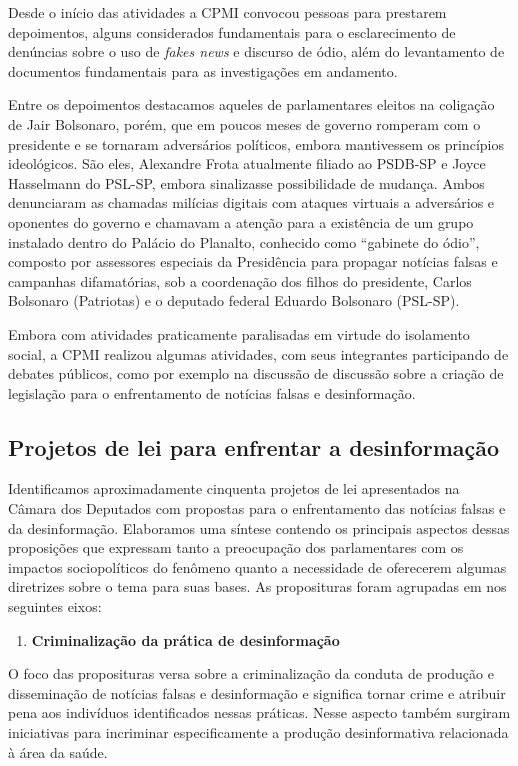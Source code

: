Desde o início das atividades a CPMI convocou pessoas para prestarem
depoimentos, alguns considerados fundamentais para o esclarecimento de
denúncias sobre o uso de \emph{fakes news} e discurso de ódio, além do
levantamento de documentos fundamentais para as investigações em
andamento.

Entre os depoimentos destacamos aqueles de parlamentares eleitos na
coligação de Jair Bolsonaro, porém, que em poucos meses de governo
romperam com o presidente e se tornaram adversários políticos, embora
mantivessem os princípios ideológicos. São eles, Alexandre Frota
atualmente filiado ao PSDB-SP e Joyce Hasselmann do PSL-SP, embora
sinalizasse possibilidade de mudança. Ambos denunciaram as chamadas
milícias digitais com ataques virtuais a adversários e oponentes do
governo e chamavam a atenção para a existência de um grupo instalado
dentro do Palácio do Planalto, conhecido como ``gabinete do ódio'',
composto por assessores especiais da Presidência para propagar notícias
falsas e campanhas difamatórias, sob a coordenação dos filhos do
presidente, Carlos Bolsonaro (Patriotas) e o deputado federal Eduardo
Bolsonaro (PSL-SP).

Embora com atividades praticamente paralisadas em virtude do isolamento
social, a CPMI realizou algumas atividades, com seus integrantes
participando de debates públicos, como por exemplo na discussão de
discussão sobre a criação de legislação para o enfrentamento de notícias
falsas e desinformação.

\subsection{Projetos de lei para enfrentar a desinformação}

Identificamos aproximadamente cinquenta projetos de lei apresentados na
Câmara dos Deputados com propostas para o enfrentamento das notícias
falsas e da desinformação. Elaboramos uma síntese contendo os principais
aspectos dessas proposições que expressam tanto a preocupação dos
parlamentares com os impactos sociopolíticos do fenômeno quanto a
necessidade de oferecerem algumas diretrizes sobre o tema para suas
bases. As proposituras foram agrupadas em nos seguintes eixos:

\begin{enumerate}
\item\textbf{Criminalização da prática de desinformação}
\end{enumerate}

O foco das proposituras versa sobre a criminalização da conduta de
produção e disseminação de notícias falsas e desinformação e significa
tornar crime e atribuir pena aos indivíduos identificados nessas
práticas. Nesse aspecto também surgiram iniciativas para incriminar
especificamente a produção desinformativa relacionada à área da saúde.

